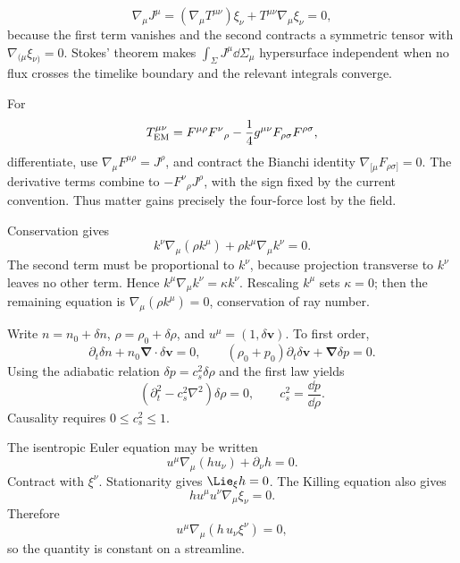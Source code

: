 \begin{solution}
\[
\nabla_\mu J^\mu
=(\nabla_\mu T^{\mu\nu})\xi_\nu
+T^{\mu\nu}\nabla_\mu\xi_\nu=0,
\]
because the first term vanishes and the second contracts a symmetric tensor
with \(\nabla_{(\mu}\xi_{\nu)}=0\).  Stokes' theorem makes
\(\int_\Sigma J^\mu\dd\Sigma_\mu\) hypersurface independent when no flux
crosses the timelike boundary and the relevant integrals converge.
\end{solution}

\begin{solution}
For
\[
T_{\rm EM}^{\mu\nu}
=F^{\mu\rho}F^\nu{}_\rho-\frac14g^{\mu\nu}F_{\rho\sigma}F^{\rho\sigma},
\]
differentiate, use \(\nabla_\mu F^{\mu\rho}=J^\rho\), and contract the Bianchi
identity \(\nabla_{[\mu}F_{\rho\sigma]}=0\).  The derivative terms combine to
\(-F^\nu{}_\rho J^\rho\), with the sign fixed by the current convention.
Thus matter gains precisely the four-force lost by the field.
\end{solution}

\begin{solution}
Conservation gives
\[
k^\nu\nabla_\mu(\rho k^\mu)
+\rho k^\mu\nabla_\mu k^\nu=0.
\]
The second term must be proportional to \(k^\nu\), because projection
transverse to \(k^\nu\) leaves no other term.  Hence
\(k^\mu\nabla_\mu k^\nu=\kappa k^\nu\).  Rescaling \(k^\mu\) sets
\(\kappa=0\); then the remaining equation is
\(\nabla_\mu(\rho k^\mu)=0\), conservation of ray number.
\end{solution}

\begin{solution}
Write \(n=n_0+\delta n\), \(\rho=\rho_0+\delta\rho\), and
\(u^\mu=(1,\delta\bm v)\).  To first order,
\[
\partial_t\delta n+n_0\bm\nabla\cdot\delta\bm v=0,\qquad
(\rho_0+p_0)\partial_t\delta\bm v+\bm\nabla\delta p=0.
\]
Using the adiabatic relation
\(\delta p=c_s^2\delta\rho\) and the first law yields
\[
(\partial_t^2-c_s^2\nabla^2)\delta\rho=0,\qquad
c_s^2=\frac{\dd p}{\dd\rho}.
\]
Causality requires \(0\leq c_s^2\leq1\).
\end{solution}

\begin{solution}
The isentropic Euler equation may be written
\[
u^\mu\nabla_\mu(hu_\nu)+\partial_\nu h=0.
\]
Contract with \(\xi^\nu\).  Stationarity gives
\(\Lie_\xi h=0\).  The Killing equation also gives
\[
hu^\mu u^\nu\nabla_\mu\xi_\nu=0.
\]
Therefore
\[
u^\mu\nabla_\mu(h\,u_\nu\xi^\nu)=0,
\]
so the quantity is constant on a streamline.
\end{solution}

